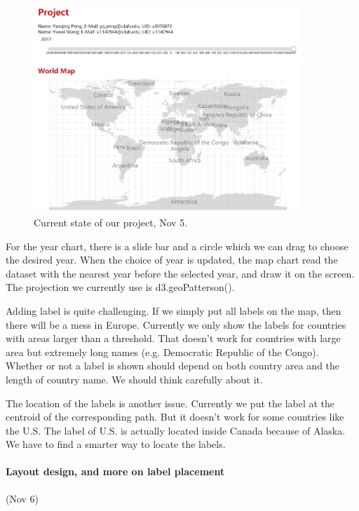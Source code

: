 \documentclass[12pt, fullpage,letterpaper]{article}
\begin{document}
\begin{figure}[h!]
    \begin{center}
        \includegraphics[width=0.9\textwidth]{figs/Nov5.jpg}
        \caption{Current state of our project, Nov 5.}
        \label{fig:nov5}
    \end{center}
\end{figure}

For the year chart, there is a slide bar and a circle which we can drag to choose the desired year.
When the choice of year is updated, the map chart read the dataset with the nearest year before the selected year,
and draw it on the screen. The projection we currently use is d3.geoPatterson().

Adding label is quite challenging. If we simply put all labels on the map,
then there will be a mess in Europe. Currently we only show the labels for countries
with areas larger than a threshold. That doesn't work for countries with large area but extremely
long names (e.g. Democratic Republic of the Congo). Whether or not a label is shown
should depend on both country area and the length of country name. We should think carefully about it.

The location of the labels is another issue. Currently we put the label
at the centroid of the corresponding path. But it doesn't work for some countries like the U.S.
The label of U.S. is actually located inside Canada because of Alaska.
We have to find a smarter way to locate the labels.

\newpage
\paragraph{Layout design, and more on label placement} (Nov 6)
\end{document}
